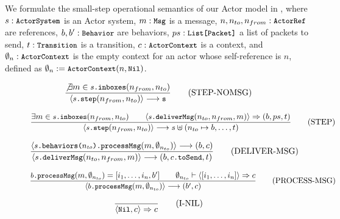 We formulate the small-step operational semantics of our Actor model in 
, where $s: \texttt{\small{ActorSystem}}$ is an Actor system,
$m: \texttt{\small{Msg}}$ is a message,
$n, n_{to}, n_{from}: \texttt{\small{ActorRef}}$ are references,
$b, b': \texttt{\small{Behavior}}$ are behaviors,
$ps: \texttt{\small{List[Packet]}}$ a list of packets to send,
$t: \texttt{\small{Transition}}$ is a transition,
$c: \texttt{\small{ActorContext}}$ is a context,
and $\emptyset_n: \texttt{\small{ActorContext}}$ is the empty context for an actor whose
self-reference is $n$, defined as $\emptyset_n := \texttt{\small{ActorContext}}(n, \texttt{\small{Nil}})$.

\begin{figure}[!h]
\begin{framed}
 
\begin{equation}
\dfrac{
  \not\exists m \in \texttt{\small{$s$.inboxes}}(n_{from}, n_{to})
}{
  \langle \texttt{\small{$s$.step}}(n_{from}, n_{to}) \rangle \longrightarrow \texttt{\small{s}}
}
\tag{STEP-NOMSG}
\end{equation}

\vspace{10pt}
\begin{equation}
\dfrac{
  \exists m \in \texttt{\small{$s$.inboxes}}(n_{from}, n_{to}) \qquad
  \langle \texttt{\small{$s$.deliverMsg}}(n_{to}, n_{from}, m) \rangle \Rightarrow (b, ps, t)
}{
  \langle \texttt{\small{$s$.step}}(n_{from}, n_{to}) \rangle \longrightarrow s \uplus (n_{to} \mapsto b, \ldots, t)
}
\tag{STEP}
\end{equation}

\vspace{10pt}
\begin{equation}
\dfrac{
  \langle \texttt{\small{$s$.behaviors($n_{to}$).processMsg}}(m, \emptyset_{n_{to}}) \rangle \longrightarrow (b, c) 
}{
   \langle \texttt{\small{$s$.deliverMsg}}(n_{to}, n_{from}, m) \rangle \longrightarrow (b, \texttt{\small{$c$.toSend}}, t)
}
\tag{DELIVER-MSG}
\end{equation}

\vspace{10pt}
\begin{equation}
\dfrac{
  \texttt{\small{$b$.processMsg}}(m, \emptyset_{n_{to}}) = [i_1, \ldots, i_n, b'] \qquad
  \emptyset_{n_{to}} \vdash \langle [i_1, \ldots, i_n] \rangle \Rightarrow c
}{
   \langle \texttt{\small{$b$.processMsg}}(m, \emptyset_{n_{to}}) \rangle \longrightarrow (b', c)
}
\tag{PROCESS-MSG}
\end{equation}

\vspace{10pt}
\begin{equation}
\dfrac{\empty}{
   \langle \stt{Nil}, c \rangle \Rightarrow c
}
\tag{I-NIL}
\end{equation}


\end{framed}
\end{figure}
